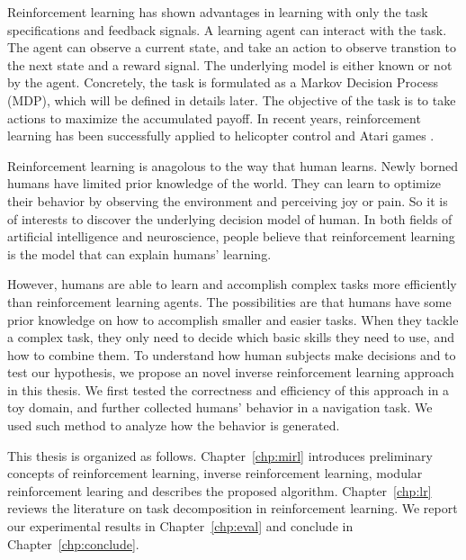 Reinforcement learning has shown advantages in learning with only the task
specifications and feedback signals. A learning agent can interact with the
task. The agent can observe a current state, and take an action to observe
transtion to the next state and a reward signal. The underlying model is either
known or not by the agent. Concretely, the task is formulated as a
Markov Decision Process (MDP), which will be defined in details later.
The objective of the task is to take actions to maximize the accumulated payoff.
In recent years, reinforcement learning has been successfully applied to
helicopter control \cite{} and Atari games \cite{}.

Reinforcement learning is anagolous to the way that human learns. Newly borned
humans have limited prior knowledge of the world. They can learn to optimize
their behavior by observing the environment and perceiving joy or pain. So it is
of interests to discover the underlying decision model of human. In both fields
of artificial intelligence and neuroscience, people believe that reinforcement
learning is the model that can explain humans' learning.

However, humans are able to learn and accomplish complex tasks more efficiently than
reinforcement learning agents. The possibilities are that humans have some prior
knowledge on how to accomplish smaller and easier tasks. When they tackle a
complex task, they only need to decide which basic skills they need to use, and
how to combine them.
To understand how human subjects make decisions and to test our hypothesis, we
propose an novel inverse reinforcement learning approach in this thesis.
We first tested the correctness and efficiency of this approach in a toy domain,
and further collected humans' behavior in a navigation task. We used such method
to analyze how the behavior is generated.

This thesis is organized as follows. Chapter~\ref{chp:mirl} introduces 
preliminary concepts of reinforcement learning, inverse reinforcement learning,
modular reinforcement learing and describes the proposed algorithm.
Chapter~\ref{chp:lr} reviews the literature on task decomposition in
reinforcement learning. We report our experimental results in
Chapter~\ref{chp:eval} and conclude in Chapter~\ref{chp:conclude}.
